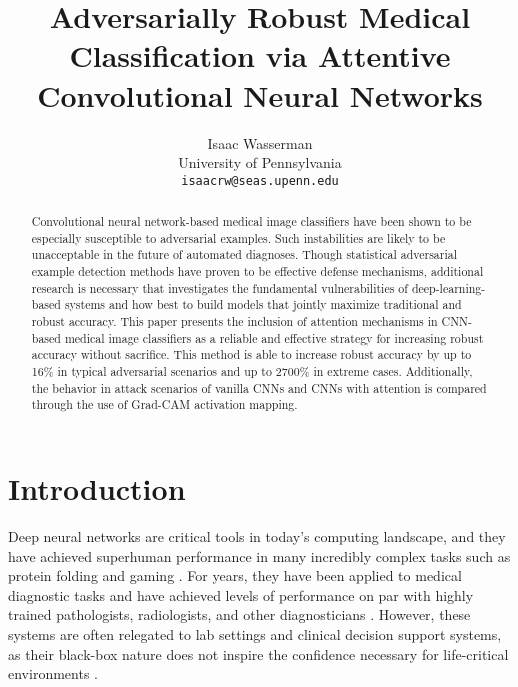 \documentclass[10pt,twocolumn,letterpaper]{article}
\begin{document}
\title{Adversarially Robust Medical Classification via Attentive Convolutional Neural Networks}

\author{Isaac Wasserman\\
  University of Pennsylvania\\
  {\tt\small isaacrw@seas.upenn.edu}
}
\maketitle

\begin{abstract}
  Convolutional neural network-based medical image classifiers have been shown to be especially susceptible to adversarial examples. Such instabilities are likely to be unacceptable in the future of automated diagnoses. Though statistical adversarial example detection methods have proven to be effective defense mechanisms, additional research is necessary that investigates the fundamental vulnerabilities of deep-learning-based systems and how best to build models that jointly maximize traditional and robust accuracy. This paper presents the inclusion of attention mechanisms in CNN-based medical image classifiers as a reliable and effective strategy for increasing robust accuracy without sacrifice. This method is able to increase robust accuracy by up to 16\% in typical adversarial scenarios and up to 2700\% in extreme cases. Additionally, the behavior in attack scenarios of vanilla CNNs and CNNs with attention is compared through the use of Grad-CAM activation mapping.
\end{abstract}

\section{Introduction}
  Deep neural networks are critical tools in today's computing landscape, and they have achieved superhuman performance in many incredibly complex tasks such as protein folding \cite{alphafold} and gaming \cite{muzero}. For years, they have been applied to medical diagnostic tasks and have achieved levels of performance on par with highly trained pathologists, radiologists, and other diagnosticians \cite{medical-cnn-survey}. However, these systems are often relegated to lab settings and clinical decision support systems, as their black-box nature does not inspire the confidence necessary for life-critical environments \cite{NIH-AI}\cite{AI-CDSS}.
  
\end{document}
